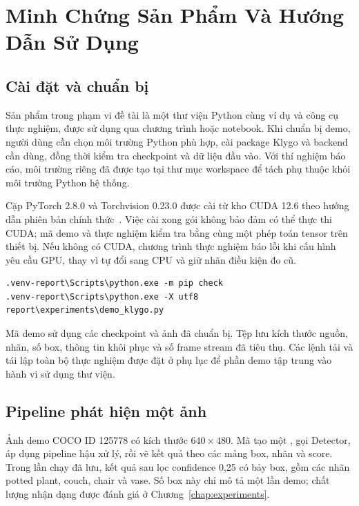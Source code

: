 \chapter{Minh Chứng Sản Phẩm Và Hướng Dẫn Sử Dụng}
\label{chap:demo}
\section{Cài đặt và chuẩn bị}
Sản phẩm trong phạm vi đề tài là một thư viện Python cùng ví dụ và công cụ thực nghiệm, được sử dụng qua chương trình hoặc notebook. Khi chuẩn bị demo, người dùng cần chọn môi trường Python phù hợp, cài package Klygo và backend cần dùng, đồng thời kiểm tra checkpoint và dữ liệu đầu vào. Với thí nghiệm báo cáo, môi trường riêng  đã được tạo tại thư mục workspace để tách phụ thuộc khỏi môi trường Python hệ thống.

Cặp PyTorch 2.8.0 và Torchvision 0.23.0 được cài từ kho CUDA 12.6 theo hướng dẫn phiên bản chính thức~\cite{pytorchversions}. Việc cài xong gói không bảo đảm có thể thực thi CUDA; mã demo và thực nghiệm kiểm tra bằng  cùng một phép toán tensor trên thiết bị. Nếu không có CUDA, chương trình thực nghiệm báo lỗi khi cấu hình yêu cầu GPU, thay vì tự đổi sang CPU và giữ nhãn điều kiện đo cũ.

\begin{lstlisting}[language={},caption={Lệnh kiểm tra môi trường và chạy demo từ workspace}]
.venv-report\Scripts\python.exe -m pip check
.venv-report\Scripts\python.exe -X utf8 report\experiments\demo_klygo.py
\end{lstlisting}
Mã demo sử dụng các checkpoint và ảnh đã chuẩn bị. Tệp  lưu kích thước nguồn, nhãn, số box, thông tin khôi phục và số frame stream đã tiêu thụ. Các lệnh tải và tái lập toàn bộ thực nghiệm được đặt ở phụ lục để phần demo tập trung vào hành vi sử dụng thư viện.

\section{Pipeline phát hiện một ảnh}
Ảnh demo COCO ID 125778 có kích thước $640\times480$. Mã tạo một , gọi Detector, áp dụng pipeline hậu xử lý, rồi vẽ kết quả theo các mảng box, nhãn và score. Trong lần chạy đã lưu, kết quả sau lọc confidence 0,25 có bảy box, gồm các nhãn potted plant, couch, chair và vase. Số box này chỉ mô tả một lần demo; chất lượng nhận dạng được đánh giá ở Chương~\ref{chap:experiments}.

